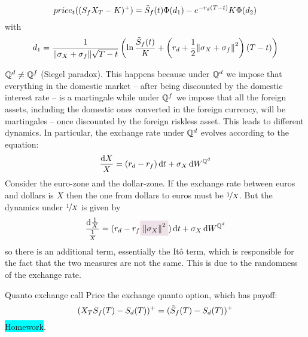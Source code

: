 \begin{equation}
    price_t((S_f X_T-K)^+) = \Tilde{S}_f(t)\Phi(d_1)-e^{-r_d(T-t)}K\Phi(d_2)
\end{equation}
with
\begin{equation}
    d_1 = \frac{1}{\norm{\sigma_X+\sigma_f}\sqrt{T-t}}\left(\ln\frac{\Tilde{S}_f(t)}{K}+\left(r_d+\frac{1}{2}\norm{\sigma_X+\sigma_f}^2\right)(T-t)\right)
\end{equation}
\begin{remark}
    $\mathbb{Q}^d \ne \mathbb{Q}^f$ (Siegel paradox). This happens because under $\mathbb{Q}^d$ we impose that everything in the domestic market -- after being discounted by the domestic interest rate -- is a martingale while under $\mathbb{Q}^f$ we impose that all the foreign assets, including the domestic ones converted in the foreign currency, will be martingales -- once discounted by the foreign riskless asset. This leads to different dynamics. In particular, the exchange rate under $\mathbb{Q}^d$ evolves according to the equation:
    \begin{equation}
       \frac{\dd X}{X} = (r_d-r_f)\,\dd t + \sigma_X\,\dd W^{\mathbb{Q}^d}  
    \end{equation}
    Consider the euro-zone and the dollar-zone. If the exchange rate between euros and dollars is $X$ then the one from dollars to euros must be $\nicefrac{1}{X}$. But the dynamics under $\nicefrac{1}{X}$ is given by 
    \begin{equation}
        \frac{\dd\frac{1}{X}}{\frac{1}{X}} = (r_d-r_f\hlc{mypink}{\norm{\sigma_X}^2})\,\dd t + \sigma_X\,\dd W^{\Qmeas^d}  
    \end{equation}
    so there is an additional term, essentially the Itô term, which is responsible for the fact that the two measures are not the same. This is due to the randomness of the exchange rate.  
\end{remark}
\begin{example}{Quanto exchange call}{}{}
    Price the exchange quanto option, which has payoff:
    \begin{equation*}
        (X_TS_f(T)-S_d(T))^+ = (\Tilde{S}_f(T)-S_d(T))^+
    \end{equation*}
    \colorbox{cyan}{Homework}.
\end{example}



